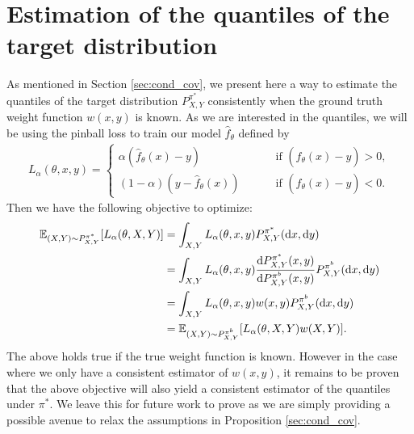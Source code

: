 
\newpage
\section{Estimation of the quantiles of the target distribution}\label{sec:estimating_target_quantiles}
As mentioned in Section \ref{sec:cond_cov}, we present here a way to estimate the quantiles of the target distribution $P_{X,Y}^{\pi^*}$ consistently when the ground truth weight function $w(x, y)$ is known. As we are interested in the quantiles, we will be using the pinball loss to train our model $\hat{f}_{\theta}$ defined by
\begin{align}
    L_{\alpha}(\theta, x, y) = \begin{cases}
         \alpha (\hat{f}_{\theta}(x)-y) \qquad &\text{ if } (\hat{f}_{\theta}(x)-y) > 0, \\
         (1-\alpha) (y -\hat{f}_{\theta}(x)) \qquad &\text{ if } (\hat{f}_{\theta}(x)-y) < 0.
    \end{cases} \nonumber
\end{align}
Then we have the following objective to optimize:
\begin{align}
\mathbb{E}_{(X,Y)\sim P^{\pi^*}_{X,Y}}[L_\alpha(\theta, X, Y)] &= \int_{X,Y} L_\alpha(\theta, x, y) P_{X,Y}^{\pi^*}(\mathrm{d}x,\mathrm{d}y) \nonumber \\
&= \int_{X,Y} L_\alpha(\theta, x, y) \frac{\mathrm{d}P_{X, Y}^{\pi^*}(x, y)}{\mathrm{d}P_{X,Y}^{\pi^b}(x, y)} P_{X,Y}^{\pi^b}(\mathrm{d}x,\mathrm{d} y) \nonumber \\
&= \int_{X,Y} L_\alpha(\theta, x, y) w(x, y) P_{X,Y}^{\pi^b}(\mathrm{d}x,\mathrm{d}y)\nonumber\\
&= \mathbb{E}_{(X,Y)\sim P^{\pi^b}_{X,Y}}[L_\alpha(\theta, X, Y) w(X, Y)]. \nonumber
\end{align}
The above holds true if the true weight function is known. However in the case where we only have a consistent estimator of $w(x, y)$, it remains to be proven that the above objective will also yield a consistent estimator of the quantiles under $\pi^*$. We leave this for future work to prove as we are simply providing a possible avenue to relax the assumptions in Proposition \ref{sec:cond_cov}. 



